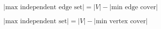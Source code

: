 $|\text{max independent edge set}|=|V|-|\text{min edge cover}|$

$|\text{max independent set}|=|V|-|\text{min vertex cover}|$